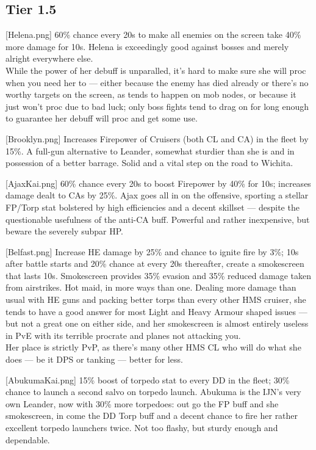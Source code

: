 \newpage
\subsection{Tier 1.5}
[Helena.png]
{60\% chance every 20s to make all enemies on the screen take 40\% more damage for 10s.}
{}
{Helena is exceedingly good against bosses and merely alright everywhere else. \\
While the power of her debuff is unparalled, it's hard to make sure she will proc when you need her to --- either because the enemy has died already or there's no worthy targets on the screen, as tends to happen on mob nodes, or because it just won't proc due to bad luck; only boss fights tend to drag on for long enough to guarantee her debuff will proc and get some use.}

[Brooklyn.png]
{Increases Firepower of Cruisers (both CL and CA) in the fleet by 15\%.}
{}
{A full-gun alternative to Leander, somewhat sturdier than she is and in possession of a better barrage. Solid and a vital step on the road to Wichita.}

 
[AjaxKai.png]
{60\% chance every 20s to boost Firepower by 40\% for 10s; increases damage dealt to CAs by 25\%.}
{}
{Ajax goes all in on the offensive, sporting a stellar FP/Torp stat bolstered by high efficiencies and a decent skillset --- despite the questionable usefulness of the anti-CA buff. Powerful and rather inexpensive, but beware the severely subpar HP.}

[Belfast.png]
{Increase HE damage by 25\% and chance to ignite fire by 3\%; 10s after battle starts and 20\% chance at every 20s thereafter, create a smokescreen that lasts 10s. Smokescreen provides 35\% evasion and 35\% reduced damage taken from airstrikes.}
{}
{Hot maid, in more ways than one. Dealing more damage than usual with HE guns and packing better torps than every other HMS cruiser, she tends to have a good answer for most Light and Heavy Armour shaped issues --- but not a great one on either side, and her smokescreen is almost entirely useless in PvE with its terrible procrate and planes not attacking you.\\
Her place is strictly PvP, as there's many other HMS CL who will do what she does --- be it DPS or tanking --- better for less.}

[AbukumaKai.png]
{15\% boost of torpedo stat to every DD in the fleet; 30\% chance to launch a second salvo on torpedo launch.}
{}
{Abukuma is the IJN's very own Leander, now with 30\% more torpedoes: out go the FP buff and she smokescreen, in come the DD Torp buff and a decent chance to fire her rather excellent torpedo launchers twice. Not too flashy, but sturdy enough and dependable.}



